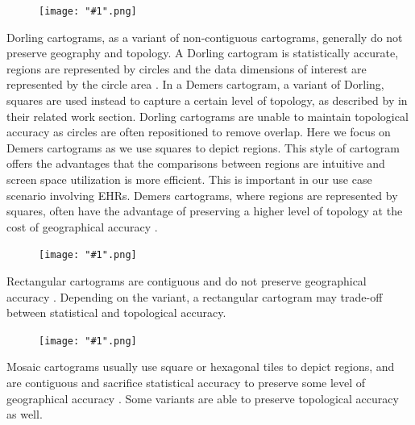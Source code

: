 \documentclass[Afour,sagev,times]{sagej}
\newcommand{\thumbnail}[2]{
    \begin{samepage}

      \setlength{\intextsep}{3pt}
      \setlength{\columnsep}{3pt}
      \begin{figure}
        \vspace{-15pt}
        \begin{center}
          \texttt{[image: "\#1".png]}
        \end{center}
      \end{figure}
      #2
      
    \end{samepage}
}
\begin{document}
\thumbnail{dorling}{
    Dorling cartograms, as a variant of non-contiguous cartograms, generally do not preserve geography and topology.
    A Dorling cartogram is statistically accurate, regions are represented by circles and the data dimensions of interest are represented by the circle area \cite{dorling2011Area}.
    In a Demers cartogram, a variant of Dorling, squares are used instead to capture a certain level of topology, as described by \citet{cano2015Mosaic} in their related work section.
    Dorling cartograms are unable to maintain topological accuracy as circles are often repositioned to remove overlap. Here we focus on Demers cartograms as we use squares to depict regions.
    This style of cartogram offers the advantages that the comparisons between regions are intuitive and screen space utilization is more efficient.
    This is important in our use case scenario involving EHRs.
    Demers cartograms, where regions are represented by squares, often have the advantage of preserving a higher level of topology at the cost of geographical accuracy \cite{ian2002Cartogram}.
}

\thumbnail{rectangular}{
    Rectangular cartograms are contiguous and do not preserve geographical accuracy \cite{raisz1934Rectangular, vankreveld2004Rectangular}. Depending on the variant, a rectangular cartogram may trade-off between statistical and topological accuracy.
}

\thumbnail{mosaic}{
    Mosaic cartograms usually use square or hexagonal tiles to depict regions, and are contiguous and sacrifice statistical accuracy to preserve some level of geographical accuracy \cite{cano2015Mosaic}. Some variants are able to preserve topological accuracy as well.
}
\end{document}
